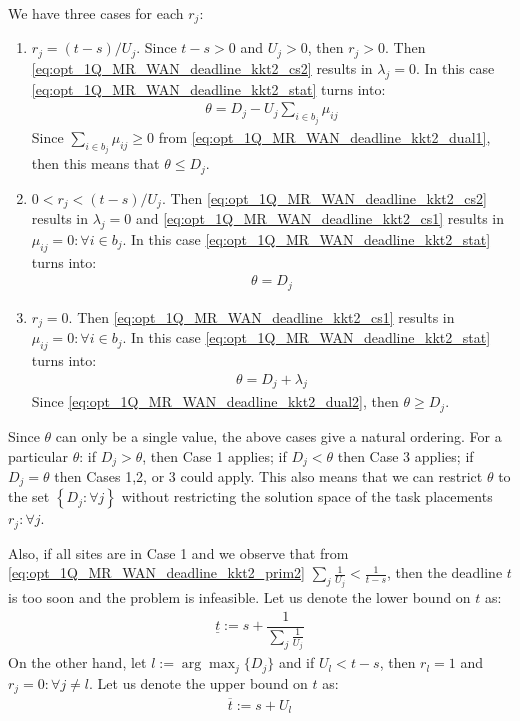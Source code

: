 We have three cases for each $r_j$:
\begin{enumerate}
	\item $r_j=(t-s)/U_j$.
	Since $t-s>0$ and $U_j>0$, then $r_j>0$.
	Then \eqref{eq:opt_1Q_MR_WAN_deadline_kkt2_cs2} results in $\lambda_j=0$.
	In this case \eqref{eq:opt_1Q_MR_WAN_deadline_kkt2_stat} turns into:
	\begin{align}
		\theta = D_j-U_j\sum_{i\in b_j}\mu_{ij} 
	\end{align}
	Since $\sum_{i\in b_j}\mu_{ij}\geq 0$ from \eqref{eq:opt_1Q_MR_WAN_deadline_kkt2_dual1}, then this means that $\theta \leq D_j$.
	\item $0<r_j<(t-s)/U_j$.
	Then \eqref{eq:opt_1Q_MR_WAN_deadline_kkt2_cs2} results in $\lambda_j=0$ and \eqref{eq:opt_1Q_MR_WAN_deadline_kkt2_cs1} results in $\mu_{ij} = 0:\forall i\in b_j$.
	In this case \eqref{eq:opt_1Q_MR_WAN_deadline_kkt2_stat} turns into:
	\begin{align}
		\theta = D_j
	\end{align}
	\item $r_j=0$.
	Then \eqref{eq:opt_1Q_MR_WAN_deadline_kkt2_cs1} results in $\mu_{ij} = 0:\forall i\in b_j$.
	In this case \eqref{eq:opt_1Q_MR_WAN_deadline_kkt2_stat} turns into:
	\begin{align}
		\theta = D_j+\lambda_j
	\end{align}
	Since \eqref{eq:opt_1Q_MR_WAN_deadline_kkt2_dual2}, then $\theta \geq D_j$.
\end{enumerate}

Since $\theta$ can only be a single value, the above cases give a natural ordering. For a particular $\theta$: if $D_j>\theta$, then Case 1 applies; if $D_j<\theta$ then Case 3 applies; if $D_j=\theta$ then Cases 1,2, or 3 could apply.
This also means that we can restrict $\theta$ to the set $\left\{D_j:\forall j\right\}$ without restricting the solution space of the task placements $r_j:\forall j$.

Also, if all sites are in Case 1 and we observe that from \eqref{eq:opt_1Q_MR_WAN_deadline_kkt2_prim2} $\sum_{j}\frac{1}{U_j}<\frac{1}{t-s}$, then the deadline $t$ is too soon and the problem is infeasible.
Let us denote the lower bound on $t$ as:
\begin{align}
	\underline{t}:=s + \dfrac{1}{\sum_{j}\frac{1}{U_j}}
\end{align}
On the other hand, let $l:=\arg\max_j\{D_j\}$ and if $U_l<t-s$, then $r_l=1$ and $r_j=0:\forall j\neq l$.
Let us denote the upper bound on $t$ as:
\begin{align}
	\overline{t}:= s + U_l
\end{align}

